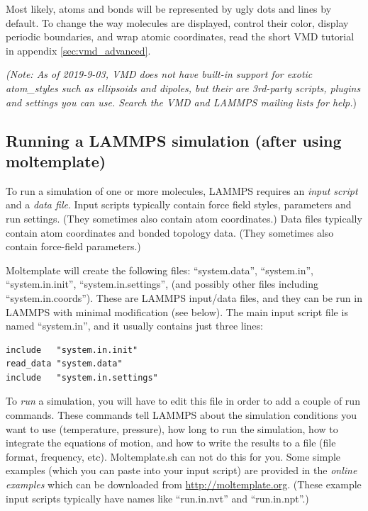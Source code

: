 \documentclass[11pt]{article}
\begin{document}
Most likely, atoms and bonds will be represented by 
ugly dots and lines by default. 
To change the way molecules are displayed, control their color, 
display periodic boundaries, and wrap atomic coordinates,  
read the short VMD tutorial in appendix \ref{sec:vmd_advanced}.

\textit{(Note:
As of 2019-9-03, 
VMD does not have built-in support for exotic atom\_styles 
such as ellipsoids and dipoles, but their are 3rd-party scripts, plugins 
and settings you can use. Search the VMD and LAMMPS mailing lists 
for help.})



\subsection{Running a LAMMPS simulation (after using moltemplate)}
\label{sec:run}
To run a simulation of one or more molecules, 
LAMMPS requires an \textit{input script} and a \textit{data file}.
Input scripts typically contain
force field styles, parameters and run settings.
(They sometimes also contain atom coordinates.)
Data files typically contain atom coordinates and bonded topology data.
(They sometimes also contain force-field parameters.)

Moltemplate will create the following files: 
``system.data'',
``system.in'',
``system.in.init'',
``system.in.settings'',
(and possibly other files including ``system.in.coords''). 
These are LAMMPS input/data files, and they can be run in LAMMPS 
with minimal modification (see below).
The main input script file is named ``system.in'', and it usually contains
just three lines:
\begin{verbatim}
include   "system.in.init"
read_data "system.data"
include   "system.in.settings"
\end{verbatim}

To \textit{run} a simulation, you will have to 
edit this file in order to add a couple of run commands.  
These commands tell LAMMPS about the simulation conditions
you want to use (temperature, pressure), 
how long to run the simulation,
how to integrate the equations of motion,
and how to write the results to a file (file format, frequency, etc).
Moltemplate.sh can not do this for you.
Some simple examples (which you can paste into your input script)
are provided in the 
\textit{online examples} 
which can be downloaded from \url{http://moltemplate.org}.
(These example input scripts 
 typically have names like ``run.in.nvt'' and ``run.in.npt''.)
\end{document}
